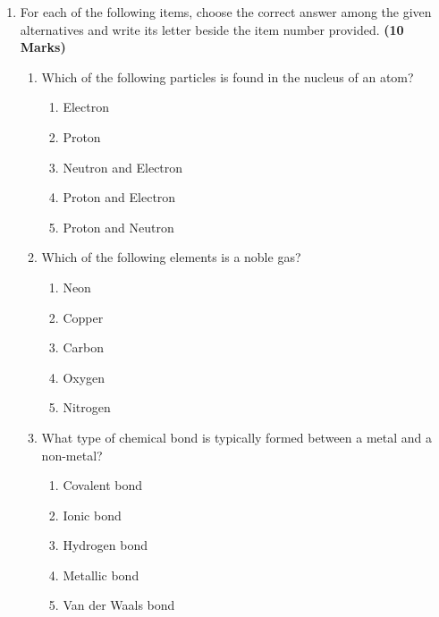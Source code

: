\documentclass[12pt]{article}
\newenvironment{questionblock}[1][10]{
    \par\Needspace{#1\baselineskip}
}{
    \par
}
\begin{document}
\begin{enumerate}
  \item For each of the following items, choose the correct answer among the given alternatives and write its letter beside the item number provided. \textbf{(10 Marks)}

  \begin{enumerate}[label=(\roman*)]

    \begin{questionblock}
      \item Which of the following particles is found in the nucleus of an atom?
      \begin{enumerate}[label=\Alph*.]
        \item Electron
        \item Proton
        \item Neutron and Electron
        \item Proton and Electron
        \item Proton and Neutron
      \end{enumerate}
      \vspace{0.8em}
    \end{questionblock}

    \begin{questionblock}
      \item Which of the following elements is a noble gas?
      \begin{enumerate}[label=\Alph*.]
        \item Neon
        \item Copper
        \item Carbon
        \item Oxygen
        \item Nitrogen
      \end{enumerate}
      \vspace{0.8em}
    \end{questionblock}

    \begin{questionblock}
      \item What type of chemical bond is typically formed between a metal and a non-metal?
      \begin{enumerate}[label=\Alph*.]
        \item Covalent bond
        \item Ionic bond
        \item Hydrogen bond
        \item Metallic bond
        \item Van der Waals bond
      \end{enumerate}
      \vspace{0.8em}
    \end{questionblock}


\end{enumerate}
\end{enumerate}
\end{document}
